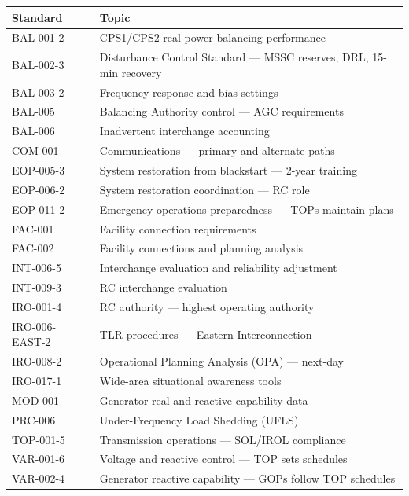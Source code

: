\documentclass[12pt,twoside,openright]{memoir}
\begin{document}
\begin{center}
\begin{tabular}{@{}lp{10cm}@{}}
\toprule
\rowcolor{nercblue!15}
\textbf{Standard} & \textbf{Topic} \\
\midrule
BAL-001-2 & CPS1/CPS2 real power balancing performance \\
\rowcolor{rowlight}
BAL-002-3 & Disturbance Control Standard — MSSC reserves, DRL, 15-min recovery \\
BAL-003-2 & Frequency response and bias settings \\
\rowcolor{rowlight}
BAL-005 & Balancing Authority control — AGC requirements \\
BAL-006 & Inadvertent interchange accounting \\
\rowcolor{rowlight}
COM-001 & Communications — primary and alternate paths \\
EOP-005-3 & System restoration from blackstart — 2-year training \\
\rowcolor{rowlight}
EOP-006-2 & System restoration coordination — RC role \\
EOP-011-2 & Emergency operations preparedness — TOPs maintain plans \\
\rowcolor{rowlight}
FAC-001 & Facility connection requirements \\
FAC-002 & Facility connections and planning analysis \\
\rowcolor{rowlight}
INT-006-5 & Interchange evaluation and reliability adjustment \\
INT-009-3 & RC interchange evaluation \\
\rowcolor{rowlight}
IRO-001-4 & RC authority — highest operating authority \\
IRO-006-EAST-2 & TLR procedures — Eastern Interconnection \\
\rowcolor{rowlight}
IRO-008-2 & Operational Planning Analysis (OPA) — next-day \\
IRO-017-1 & Wide-area situational awareness tools \\
\rowcolor{rowlight}
MOD-001 & Generator real and reactive capability data \\
PRC-006 & Under-Frequency Load Shedding (UFLS) \\
\rowcolor{rowlight}
TOP-001-5 & Transmission operations — SOL/IROL compliance \\
VAR-001-6 & Voltage and reactive control — TOP sets schedules \\
\rowcolor{rowlight}
VAR-002-4 & Generator reactive capability — GOPs follow TOP schedules \\
\bottomrule
\end{tabular}
\end{center}
\end{document}
